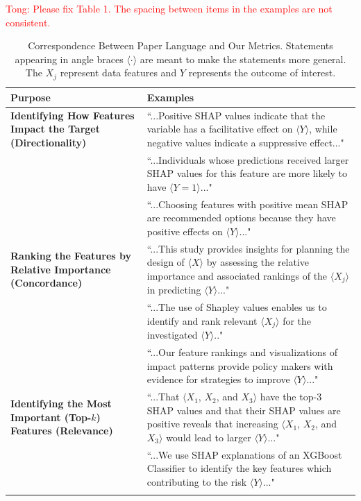 \documentclass[mnsc,blindrev]{informs3}
\newcommand{\tw}[1]{\textcolor{red}{Tong: #1}}
\begin{document}
\tw{Please fix Table 1. The spacing between items in the examples are not consistent. }
\begin{table}[htbp]
\small
\caption{Correspondence Between Paper Language and Our Metrics.  Statements appearing in angle braces $\langle \cdot \rangle$ 
are meant to make the statements more general. The $X_j$ represent data features and $Y$ represents the outcome of interest.}
\begin{tabu} to 1
\toprule
\textbf{Purpose} & \textbf{Examples} \\
\hline
\textbf{Identifying How Features Impact the Target (Directionality)}
& ``...Positive SHAP values indicate that the variable has a facilitative effect on $\langle Y\rangle$, while negative values indicate a suppressive effect..." \\ 
& \vspace{-.8cm}``...Individuals whose predictions received larger SHAP values for this feature are more likely to have $\langle Y=1\rangle$..."\\
& ``...Choosing features with positive mean SHAP are recommended options because they have positive effects on $\langle Y\rangle$..." \\
\hline
\textbf{Ranking the Features by Relative Importance (Concordance)}
& ``...This study provides insights for planning the design of $\langle X\rangle$ by assessing the relative importance and associated rankings of the $\langle X_j\rangle$ in predicting $\langle Y\rangle$..."\\\smallskip
& \vspace{-.8cm}``...The use of Shapley values enables us to identify and rank relevant $\langle X_j\rangle$ for the investigated $\langle Y\rangle$.."\\\smallskip
& ``...Our feature rankings and visualizations of impact patterns provide policy makers with evidence for strategies to improve $\langle Y\rangle$..." \\
\hline
\textbf{Identifying the Most Important (Top-$k$) Features (Relevance)\hspace{3cm}}
& ``...That $\langle X_1$, $X_2$, and $X_3\rangle$ have the top-3 SHAP values and that their SHAP values are positive reveals that increasing $\langle X_1$, $X_2$, and $X_3\rangle$ would lead to larger $\langle Y\rangle$..."\\\smallskip
& \vspace{-.8cm}``...We use SHAP explanations of an XGBoost Classifier to identify the key features which contributing to the risk $\langle Y\rangle$..."\\\smallskip

\end{tabu}
\end{table}
\end{document}
